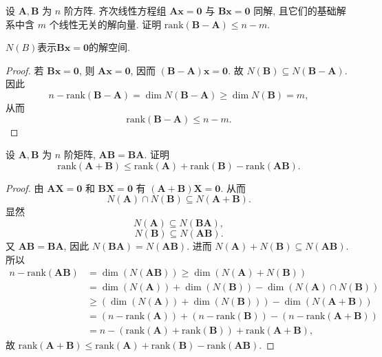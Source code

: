 \documentclass[../../main.tex]{subfiles}%
\begin{document}
\begin{example}
设 $\boldsymbol{A},\boldsymbol{B}$ 为 $n$ 阶方阵. 齐次线性方程组 $\boldsymbol{A}\boldsymbol{x} = \boldsymbol{0}$ 与 $\boldsymbol{B}\boldsymbol{x} = \boldsymbol{0}$ 同解, 且它们的基础解系中含 $m$ 个线性无关的解向量. 证明 $\mathrm{rank}(\boldsymbol{B} - \boldsymbol{A}) \leqslant n - m$.
\end{example}
\begin{remark}
$N(B)$表示$\boldsymbol{B}\boldsymbol{x} = \boldsymbol{0}$的解空间.
\end{remark}
\begin{proof}
若 $\boldsymbol{B}\boldsymbol{x} = \boldsymbol{0}$, 则 $\boldsymbol{A}\boldsymbol{x} = \boldsymbol{0}$, 因而 $(\boldsymbol{B} - \boldsymbol{A})\boldsymbol{x} = \boldsymbol{0}$. 故 $N(\boldsymbol{B}) \subseteq N(\boldsymbol{B} - \boldsymbol{A})$. 因此
\[
n - \mathrm{rank}(\boldsymbol{B} - \boldsymbol{A}) = \dim N(\boldsymbol{B} - \boldsymbol{A}) \geqslant \dim N(\boldsymbol{B}) = m,
\]
从而
\[
\mathrm{rank}(\boldsymbol{B} - \boldsymbol{A}) \leqslant n - m.
\]
\end{proof}

\begin{example}
设 $\boldsymbol{A},\boldsymbol{B}$ 为 $n$ 阶矩阵, $\boldsymbol{AB} = \boldsymbol{BA}$. 证明
\[
\mathrm{rank}(\boldsymbol{A} + \boldsymbol{B}) \leqslant \mathrm{rank}(\boldsymbol{A}) + \mathrm{rank}(\boldsymbol{B}) - \mathrm{rank}(\boldsymbol{AB}).
\]
\end{example}
\begin{proof}
由 $\boldsymbol{A}\boldsymbol{X} = \boldsymbol{0}$ 和 $\boldsymbol{B}\boldsymbol{X} = \boldsymbol{0}$ 有 $(\boldsymbol{A} + \boldsymbol{B})\boldsymbol{X} = \boldsymbol{0}$. 从而
\[
N(\boldsymbol{A}) \cap N(\boldsymbol{B}) \subseteq N(\boldsymbol{A} + \boldsymbol{B}).
\]
显然
\[
N(\boldsymbol{A}) \subseteq N(\boldsymbol{BA}),
\]
\[
N(\boldsymbol{B}) \subseteq N(\boldsymbol{AB}).
\]
又 $\boldsymbol{AB} = \boldsymbol{BA}$, 因此 $N(\boldsymbol{BA}) = N(\boldsymbol{AB})$. 进而 $N(\boldsymbol{A}) + N(\boldsymbol{B}) \subseteq N(\boldsymbol{AB})$. 所以
\begin{align*}
n - \mathrm{rank}(\boldsymbol{AB}) &= \dim (N(\boldsymbol{AB})) \geqslant \dim (N(\boldsymbol{A}) + N(\boldsymbol{B})) \\
&= \dim (N(\boldsymbol{A})) + \dim (N(\boldsymbol{B})) - \dim (N(\boldsymbol{A}) \cap N(\boldsymbol{B})) \\
&\geqslant (\dim (N(\boldsymbol{A})) + \dim (N(\boldsymbol{B}))) - \dim (N(\boldsymbol{A} + \boldsymbol{B})) \\
&= (n - \mathrm{rank}(\boldsymbol{A})) + (n - \mathrm{rank}(\boldsymbol{B})) - (n - \mathrm{rank}(\boldsymbol{A} + \boldsymbol{B})) \\
&= n - (\mathrm{rank}(\boldsymbol{A}) + \mathrm{rank}(\boldsymbol{B})) + \mathrm{rank}(\boldsymbol{A} + \boldsymbol{B}),
\end{align*}
故 $\mathrm{rank}(\boldsymbol{A} + \boldsymbol{B}) \leqslant \mathrm{rank}(\boldsymbol{A}) + \mathrm{rank}(\boldsymbol{B}) - \mathrm{rank}(\boldsymbol{AB})$.
\end{proof}
\end{document}
